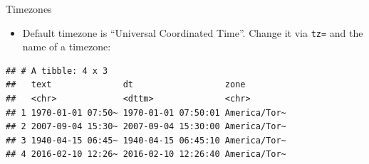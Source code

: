 \documentclass[
  ignorenonframetext,
]{beamer}
\newenvironment{Shaded}{\begin{snugshade}}{\end{snugshade}}
\newcommand{\DataTypeTok}[1]{\textcolor[rgb]{0.13,0.29,0.53}{#1}}
\newcommand{\KeywordTok}[1]{\textcolor[rgb]{0.13,0.29,0.53}{\textbf{#1}}}
\newcommand{\NormalTok}[1]{#1}
\newcommand{\OperatorTok}[1]{\textcolor[rgb]{0.81,0.36,0.00}{\textbf{#1}}}
\newcommand{\StringTok}[1]{\textcolor[rgb]{0.31,0.60,0.02}{#1}}
\providecommand{\tightlist}{%
  \setlength{\itemsep}{0pt}\setlength{\parskip}{0pt}}
\begin{document}
\begin{frame}[fragile]{Timezones}
\protect\hypertarget{timezones}{}

\begin{itemize}
\tightlist
\item
  Default timezone is ``Universal Coordinated Time''. Change it via
  \texttt{tz=} and the name of a timezone:
\end{itemize}

\begin{Shaded}
\end{Shaded}

\begin{verbatim}
## # A tibble: 4 x 3
##   text              dt                  zone        
##   <chr>             <dttm>              <chr>       
## 1 1970-01-01 07:50~ 1970-01-01 07:50:01 America/Tor~
## 2 2007-09-04 15:30~ 2007-09-04 15:30:00 America/Tor~
## 3 1940-04-15 06:45~ 1940-04-15 06:45:10 America/Tor~
## 4 2016-02-10 12:26~ 2016-02-10 12:26:40 America/Tor~
\end{verbatim}

\end{frame}
\end{document}
